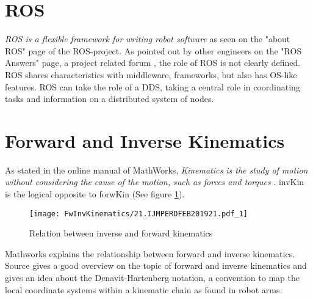 
\section{ROS}
\textit{%
ROS is a flexible framework for writing robot software} as seen on the "about ROS" page of the ROS-project. As pointed out by other engineers on the "ROS Answers" page, a project related forum \cite{ROSAnswers_WhatIsRos}, the role of ROS is not clearly defined. ROS shares characteristics with middleware, frameworks, but also has \ac{OS}-like features. \ac{ROS} can take the role of a \ac{DDS}, taking a central role in coordinating tasks and information on a distributed system of nodes. %
\medskip

\section{Forward and Inverse Kinematics}

As stated in the online manual of MathWorks, \textit{Kinematics is the study of motion without considering the cause of the motion, such as forces and torques} \cite{MathWorksInverseKinematics}.
\Gls{invKin} is the logical opposite to \Gls{forwKin} (See figure \ref{fig:FwVsInvKin}). 


\begin{figure}[h]
	\texttt{[image: FwInvKinematics/21.IJMPERDFEB201921.pdf\_1]}
	\caption{Relation between inverse and forward kinematics \cite{SpaceStationManipulator}}
	\label{fig:FwVsInvKin}
\end{figure}







Mathworks \cite{forwardVsInverseKinematics} explains the relationship between forward and inverse kinematics.
Source \cite{allgInvKin} gives a good overview on the topic of forward and inverse kinematics and gives an idea about the Denavit-Hartenberg notation, a convention to map the local coordinate systems within a kinematic chain as found in robot arms.

